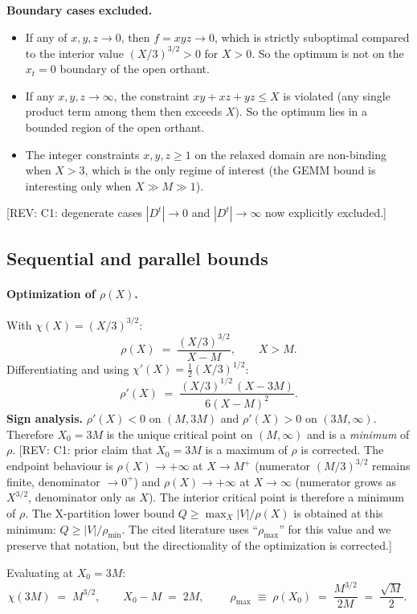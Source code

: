 \documentclass[11pt]{article}
\newcommand{\REV}[1]{\textcolor{blue!60!black}{\small\textsf{[REV: #1]}}}
\begin{document}
\textbf{Boundary cases excluded.}
\begin{itemize}[leftmargin=2em]
  \item If any of $x,y,z \to 0$, then $f = xyz \to 0$, which is strictly
    suboptimal compared to the interior value $(X/3)^{3/2} > 0$ for
    $X > 0$. So the optimum is not on the $x_t = 0$ boundary of the
    open orthant.
  \item If any $x,y,z \to \infty$, the constraint $xy + xz + yz \le X$
    is violated (any single product term among them then exceeds $X$).
    So the optimum lies in a bounded region of the open orthant.
  \item The integer constraints $x,y,z \ge 1$ on the relaxed domain
    are non-binding when $X > 3$, which is the only regime of interest
    (the GEMM bound is interesting only when $X \gg M \gg 1$).
\end{itemize}
\REV{C1: degenerate cases $|D^t| \to 0$ and $|D^t| \to \infty$ now
explicitly excluded.}

\subsection{Sequential and parallel bounds}
\label{sec:A2c}

\paragraph{Optimization of $\rho(X)$.}
With $\chi(X) = (X/3)^{3/2}$:
\[
  \rho(X) \;=\; \frac{(X/3)^{3/2}}{X-M}, \qquad X > M.
\]
Differentiating and using $\chi'(X) = \tfrac{1}{2}(X/3)^{1/2}$:
\[
\rho'(X) \;=\; \frac{(X/3)^{1/2}\,(X - 3M)}{6(X-M)^2}.
\]
\textbf{Sign analysis.} $\rho'(X) < 0$ on $(M, 3M)$ and $\rho'(X) > 0$
on $(3M, \infty)$. Therefore $X_0 = 3M$ is the unique critical point
on $(M,\infty)$ and is a \emph{minimum} of $\rho$.
\REV{C1: prior claim that $X_0 = 3M$ is a maximum of $\rho$ is corrected.
The endpoint behaviour is $\rho(X) \to +\infty$ at $X \to M^+$
(numerator $(M/3)^{3/2}$ remains finite, denominator $\to 0^+$) and
$\rho(X) \to +\infty$ at $X \to \infty$ (numerator grows as $X^{3/2}$,
denominator only as $X$). The interior critical point is therefore a
minimum of $\rho$. The X-partition lower bound
$Q \ge \max_X |V|/\rho(X)$ is obtained at this minimum:
$Q \ge |V|/\rho_{\min}$. The cited literature uses ``$\rho_{\max}$''
for this value and we preserve that notation, but the directionality
of the optimization is corrected.}

Evaluating at $X_0 = 3M$:
\[
  \chi(3M) \;=\; M^{3/2},\qquad
  X_0 - M \;=\; 2M,\qquad
  \boxed{\;\rho_{\max} \;\equiv\; \rho(X_0) \;=\; \frac{M^{3/2}}{2M} \;=\; \frac{\sqrt{M}}{2}.\;}
\]
\end{document}
